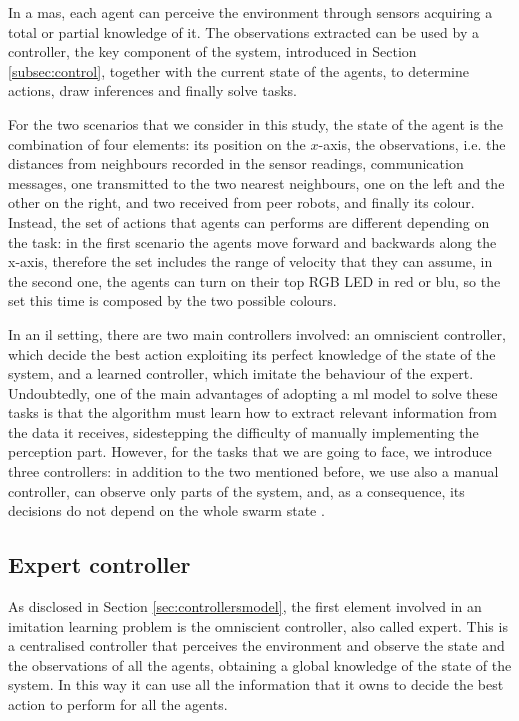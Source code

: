 
In a \gls{mas}, each agent can perceive the environment through sensors 
acquiring a total or partial knowledge of it. The observations extracted can be 
used by a controller, the key component of the system, introduced in Section 
\ref{subsec:control}, together with the current state of the agents, to determine 
actions, draw inferences and finally solve tasks. 

For the two scenarios that we consider in this study, the state of the agent is the 
combination of four elements: its position on the $x$-axis, the observations, i.e. 
the distances from neighbours recorded in the sensor readings, communication 
messages, one transmitted to the two nearest neighbours, one on the left and the 
other on the right, and two received from peer robots, and finally its colour.
Instead, the set of actions that agents can performs are different depending on 
the task: in the first scenario the agents move forward and backwards along the 
x-axis, therefore the set includes the range of velocity that they can assume, in the 
second one, the agents  can turn on their top RGB LED in red or blu, so the set this 
time is composed by the two possible colours.

In an \gls{il} setting, there are two main controllers involved: an omniscient 
controller, which decide the best action exploiting its perfect knowledge of the 
state of the system, and a learned controller, which imitate the behaviour of the 
expert.
Undoubtedly, one of the main advantages of adopting a \gls{ml} model to solve 
these tasks is that the algorithm must learn how to extract relevant information 
from the data it receives, sidestepping the difficulty of manually implementing the 
perception part.
However, for the tasks that we are going to face, we introduce three controllers: in 
addition to the two mentioned before, we use also a manual controller, can 
observe only parts of the system, and, as a consequence, its decisions do not 
depend on the whole swarm state \cite[][]{vsovsic2016inverse}.

\subsection{Expert controller}
\label{subsec:expert}

As disclosed in Section \ref{sec:controllersmodel}, the first element involved in an 
imitation learning problem is the omniscient controller, also called expert. 
This is a centralised controller that perceives the environment and observe the 
state and the observations of all the agents, obtaining a global knowledge of the 
state of the system. In this way it can use all the information that it owns to decide 
the best action to perform for all the agents. 


